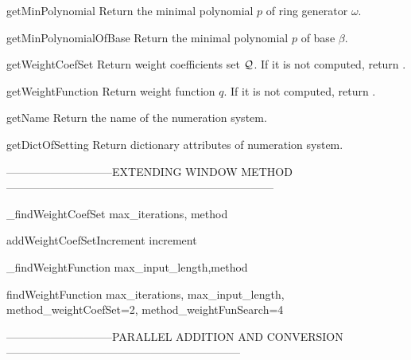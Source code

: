 \begin{method}{getMinPolynomial}{}
Return the minimal polynomial $p$ of ring generator $\omega$.
\end{method}


\begin{method}{getMinPolynomialOfBase}{}
Return the minimal polynomial $p$ of base $\beta$.
\end{method}


\begin{method}{getWeightCoefSet}{}
Return weight coefficients set $\mathcal{Q}$. If it is not computed, return .
\end{method}


\begin{method}{getWeightFunction}{}
Return weight function $q$. If it is not computed, return .
\end{method}


\begin{method}{getName}{}
Return the name of the numeration system.
\end{method}


\begin{method}{getDictOfSetting}{}
Return dictionary attributes of numeration system.
\end{method}


-----------------------------EXTENDING WINDOW METHOD------------------------------------------------------------------------

\begin{method}{\_findWeightCoefSet}{ max\_iterations, method}

\end{method}


\begin{method}{addWeightCoefSetIncrement}{ increment}

\end{method}


\begin{method}{\_findWeightFunction}{ max\_input\_length,method}

\end{method}


\begin{method}{findWeightFunction}{ max\_iterations, max\_input\_length, method\_weightCoefSet=2, method\_weightFunSearch=4}

\end{method}


-----------------------------PARALLEL ADDITION AND CONVERSION---------------------------------------------------------------

